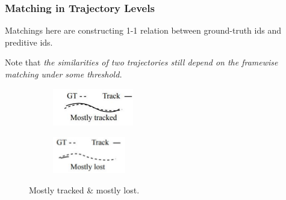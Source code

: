 \documentclass[slidetop, mathserif]{beamer}
\begin{document}
\begin{frame}
	\frametitle{Matching in Trajectory Levels}
	    

	Matchings here are constructing 1-1 relation between ground-truth ids and preditive ids.
	    
	\quad
	
	Note that \emph{the similarities of two trajectories still depend on the
	framewise matching under some threshold.}
	\begin{figure}
		\begin{subfigure}{.5\textwidth}
			\centering
			\includegraphics[width=100pt]{pics/fig4.png}
		\end{subfigure}%
		\begin{subfigure}{.5\textwidth}
			\centering
			\includegraphics[width=90pt]{pics/fig5.png}
		\end{subfigure}
		\caption{Mostly tracked \& mostly lost.}
	\end{figure}
	
\end{frame}
\end{document}
